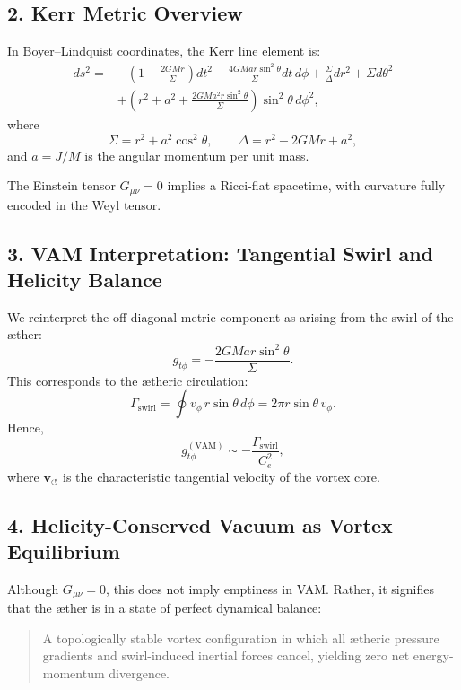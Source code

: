 \documentclass[twocolumn,aps,pre,floatfix,nofootinbib]{revtex4-2}
\begin{document}
    \subsection*{2. Kerr Metric Overview}
    In Boyer--Lindquist coordinates, the Kerr line element is:
    \begin{equation}
        \begin{aligned}
            ds^2 = & -\left(1 - \frac{2 G M r}{\Sigma} \right) dt^2 - \frac{4 G M a r \sin^2\theta}{\Sigma} dt\, d\phi + \frac{\Sigma}{\Delta} dr^2 + \Sigma d\theta^2 \\
            & + \left(r^2 + a^2 + \frac{2 G M a^2 r \sin^2\theta}{\Sigma} \right) \sin^2\theta\, d\phi^2,
        \end{aligned}
    \end{equation}
    where
    \[
        \Sigma = r^2 + a^2 \cos^2\theta, \qquad \Delta = r^2 - 2 G M r + a^2,
    \]
    and \( a = J/M \) is the angular momentum per unit mass.

    The Einstein tensor \( G_{\mu\nu} = 0 \) implies a Ricci-flat spacetime, with curvature fully encoded in the Weyl tensor.

    \subsection*{3. VAM Interpretation: Tangential Swirl and Helicity Balance}
    We reinterpret the off-diagonal metric component as arising from the swirl of the æther:
    \begin{equation}
        g_{t\phi} = -\frac{2 G M a r \sin^2\theta}{\Sigma}.
    \end{equation}
    This corresponds to the ætheric circulation:
    \begin{equation}
        \Gamma_{\text{swirl}} = \oint v_\phi\, r \sin\theta\, d\phi = 2\pi r \sin\theta\, v_\phi.
    \end{equation}
    Hence,
    \begin{equation}
        g_{t\phi}^{(\text{VAM})} \sim -\frac{\Gamma_{\text{swirl}}}{C_e^2},
    \end{equation}
    where \( \mathbf{v}_{\scriptscriptstyle\boldsymbol{\circlearrowleft}} \) is the characteristic tangential velocity of the vortex core.

    \subsection*{4. Helicity-Conserved Vacuum as Vortex Equilibrium}
    Although \( G_{\mu\nu} = 0 \), this does not imply emptiness in VAM. Rather, it signifies that the æther is in a state of perfect dynamical balance:
    \begin{quote}
        A topologically stable vortex configuration in which all ætheric pressure gradients and swirl-induced inertial forces cancel, yielding zero net energy-momentum divergence.
    \end{quote}
\end{document}

